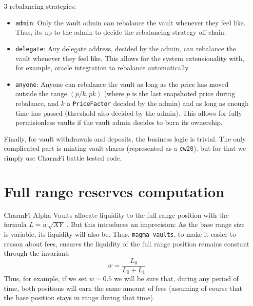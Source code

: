 \documentclass[11pt]{article}
\begin{document}
3 rebalancing strategies:
\begin{itemize}
    \item \texttt{admin}: Only the vault admin can rebalance the vault whenever they
        feel like. Thus, its up to the admin to decide the rebalancing strategy off-chain.
    \item \texttt{delegate}: Any delegate address, decided by the admin, can rebalance
        the vault whenever they feel like. This allows for the system extensionality with,
        for example, oracle integration to rebalance automatically.
    \item \texttt{anyone}: Anyone can rebalance the vault as long as the price
        has moved outside the range $(p/k, pk)$ (where $p$ is the last
        snapshoted price during rebalance, and $k$ a \texttt{PriceFactor}
        decided by the admin) and as long as enough time has passed (threshold also
        decided by the admin). This allows for fully permisionless vaults if the
        vault admin decides to burn its ownership.
\end{itemize}
Finally, for vault withdrawals and deposits, the business logic is trivial. The
only complicated part is minting vault shares (represented as a \texttt{cw20}),
but for that we simply use CharmFi battle tested code.

\section{Full range reserves computation}
CharmFi Alpha Vaults allocate liquidity to the full range position with
the formula $L = w\sqrt{XY}$ \cite{charmfi-liquidity-computation}. But this
introduces an imprecision: As the base range size is variable, its liquidity
will also be. Thus, \texttt{magma-vaults}, to make it easier to reason about fees,
ensures the liquidity of the full range position remains constant through the
invariant:
\[
w = \frac{L_0}{L_0 + L_1}
\]
Thus, for example, if we set $w = 0.5$ we will be sure that, during any period
of time, both positions will earn the same amount of fees (assuming of course that
the base position stays in range during that time).
\end{document}
